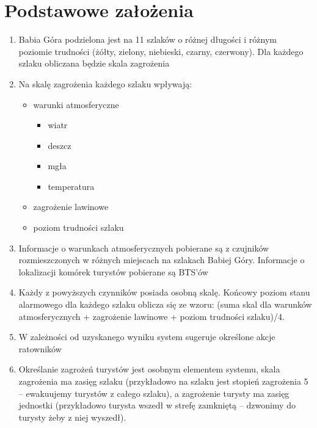 \documentclass[a4paper,12pt]{article}
\begin{document}
\section{Podstawowe założenia}
\begin{enumerate}
\item Babia Góra podzielona jest na 11 szlaków o różnej długości i różnym poziomie trudności (żółty, zielony, niebieski, czarny, czerwony). Dla każdego szlaku obliczana będzie skala zagrożenia
\item Na skalę zagrożenia każdego szlaku wpływają:
\begin{itemize}
\item warunki atmosferyczne
\begin{itemize}
\item wiatr
\item deszcz
\item mgła
\item temperatura
\end{itemize}
\item zagrożenie lawinowe
\item poziom trudności szlaku
\end{itemize}
\item Informacje o warunkach atmosferycznych pobierane są z czujników rozmieszczonych w różnych miejscach na szlakach Babiej Góry. Informacje o lokalizacji komórek turystów pobierane są BTS’ów
\item Każdy z powyższych czynników posiada osobną skalę. Końcowy poziom stanu alarmowego dla każdego szlaku oblicza się ze wzoru: (suma skal dla warunków atmosferycznych + zagrożenie lawinowe + poziom trudności szlaku)/4.
\item W zależności od uzyskanego wyniku system sugeruje określone akcje ratowników
\item Określanie zagrożeń turystów jest osobnym elementem systemu, skala zagrożenia ma zasięg szlaku (przykładowo na szlaku jest stopień zagrożenia 5 -- ewakuujemy turystów z całego szlaku), a zagrożenie turysty ma zasięg jednostki (przykładowo turysta wszedł w strefę zamkniętą -- dzwonimy do turysty żeby z niej wyszedł).
\end{enumerate}
\newpage
\end{document}
